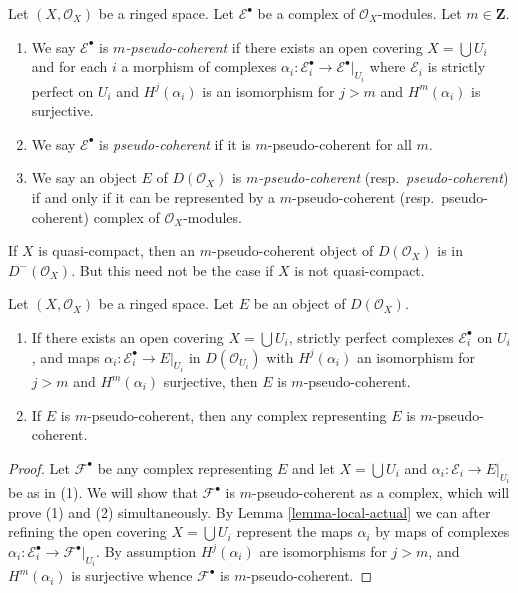 \begin{definition}
\label{definition-pseudo-coherent}
Let $(X, \mathcal{O}_X)$ be a ringed space. Let $\mathcal{E}^\bullet$
be a complex of $\mathcal{O}_X$-modules. Let $m \in \mathbf{Z}$.
\begin{enumerate}
\item We say $\mathcal{E}^\bullet$ is {\it $m$-pseudo-coherent}
if there exists an open covering $X = \bigcup U_i$ and for each $i$
a morphism of complexes
$\alpha_i : \mathcal{E}_i^\bullet \to \mathcal{E}^\bullet|_{U_i}$
where $\mathcal{E}_i$ is strictly perfect on $U_i$ and
$H^j(\alpha_i)$ is an isomorphism for $j > m$ and $H^m(\alpha_i)$
is surjective.
\item We say $\mathcal{E}^\bullet$ is {\it pseudo-coherent}
if it is $m$-pseudo-coherent for all $m$.
\item We say an object $E$ of $D(\mathcal{O}_X)$ is
{\it $m$-pseudo-coherent} (resp.\ {\it pseudo-coherent})
if and only if it can be represented by a $m$-pseudo-coherent
(resp.\ pseudo-coherent) complex of $\mathcal{O}_X$-modules.
\end{enumerate}
\end{definition}

\noindent
If $X$ is quasi-compact, then an $m$-pseudo-coherent object
of $D(\mathcal{O}_X)$ is in $D^-(\mathcal{O}_X)$. But this need
not be the case if $X$ is not quasi-compact.

\begin{lemma}
\label{lemma-pseudo-coherent-independent-representative}
Let $(X, \mathcal{O}_X)$ be a ringed space. Let $E$ be an object
of $D(\mathcal{O}_X)$.
\begin{enumerate}
\item If there exists an open covering $X = \bigcup U_i$,
strictly perfect complexes $\mathcal{E}_i^\bullet$ on $U_i$, and
maps $\alpha_i : \mathcal{E}_i^\bullet \to E|_{U_i}$ in
$D(\mathcal{O}_{U_i})$ with $H^j(\alpha_i)$ an isomorphism for $j > m$
and $H^m(\alpha_i)$ surjective, then $E$ is $m$-pseudo-coherent.
\item If $E$ is $m$-pseudo-coherent, then any complex representing
$E$ is $m$-pseudo-coherent.
\end{enumerate}
\end{lemma}

\begin{proof}
Let $\mathcal{F}^\bullet$ be any complex representing $E$
and let $X = \bigcup U_i$ and
$\alpha_i : \mathcal{E}_i \to E|_{U_i}$ be as in (1).
We will show that $\mathcal{F}^\bullet$ is $m$-pseudo-coherent
as a complex, which will prove (1) and (2) simultaneously.
By Lemma \ref{lemma-local-actual}
we can after refining the open covering $X = \bigcup U_i$
represent the maps $\alpha_i$ by maps of complexes
$\alpha_i : \mathcal{E}_i^\bullet \to \mathcal{F}^\bullet|_{U_i}$.
By assumption
$H^j(\alpha_i)$ are isomorphisms for $j > m$, and $H^m(\alpha_i)$
is surjective whence $\mathcal{F}^\bullet$ is
$m$-pseudo-coherent.
\end{proof}

